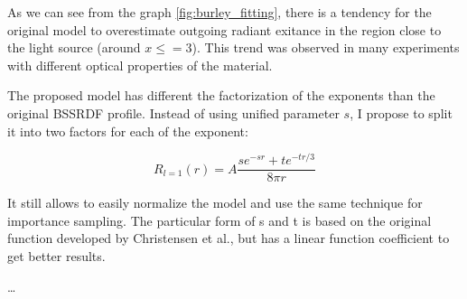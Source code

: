 As we can see from the graph \ref{fig:burley_fitting}, there is a tendency for
the original model to overestimate outgoing radiant exitance in the region close
to the light source (around $x\leq=3$). This trend was observed in many
experiments with different optical properties of the material.

The proposed model has different the factorization of the exponents than the
original \gls{BSSRDF} profile. Instead of using unified parameter $s$, I propose
to split it into two factors for each of the exponent:

\begin{equation}\label{eq:burley_modified}
R_{l=1}(r) = A\dfrac{se^{-sr}+te^{-tr/3}}{8\pi r}
\end{equation}

It still allows to easily normalize the model and use the same technique for
importance sampling. The particular form of s and t is based on the original
function developed by Christensen et al., but has a linear function coefficient
to get better results.

\ldots